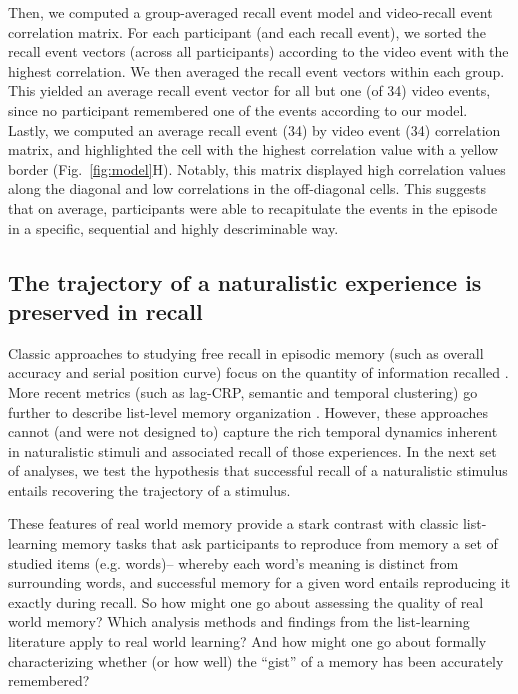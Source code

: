 Then, we computed a group-averaged recall event model and video-recall event correlation matrix. For each participant (and each recall event), we sorted the recall event vectors (across all participants) according to the video event with the highest correlation. We then averaged the recall event vectors within each group. This yielded an average recall event vector for all but one (of 34) video events, since no participant remembered one of the events according to our model. Lastly, we computed an average recall event (34) by video event (34) correlation matrix, and highlighted the cell with the highest correlation value with a yellow border (Fig.~\ref{fig:model}H). Notably, this matrix displayed high correlation values along the diagonal and low correlations in the off-diagonal cells. This suggests that on average, participants were able to recapitulate the events in the episode in a specific, sequential and highly descriminable way.

\subsection*{The trajectory of a naturalistic experience is preserved in recall}
Classic approaches to studying free recall in episodic memory (such as overall accuracy and serial position curve) focus on the quantity of information recalled \citep{Murd62a}. More recent metrics (such as lag-CRP, semantic and temporal clustering) go further to describe list-level memory organization \citep{Kaha96, PolyEtal09}. However, these approaches cannot (and were not designed to) capture the rich temporal dynamics inherent in naturalistic stimuli and associated recall of those experiences. In the next set of analyses, we test the hypothesis that successful recall of a naturalistic stimulus entails recovering the trajectory of a stimulus.




These features of real world memory provide a stark contrast with classic list-learning memory tasks that ask participants to reproduce from memory a set of studied items (e.g. words)-- whereby each word's meaning is distinct from surrounding words, and successful memory for a given word entails reproducing it exactly during recall.  So how might one go about assessing the quality of real world memory?  Which analysis methods and findings from the list-learning literature apply to real world learning?  And how might one go about formally characterizing whether (or how well) the ``gist'' of a memory has been accurately remembered?




